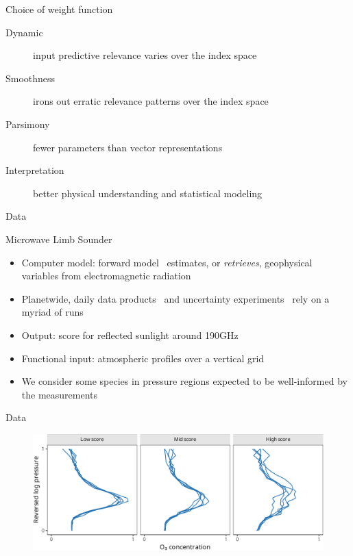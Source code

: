 \documentclass[final]{beamer}
\begin{document}
\begin{frame}[t]
{\begin{minipage}[t][76cm][t]{58cm}
{\begin{minipage}[t][40cm][t]{28cm}
          \begin{block}{Choice of weight function}
            \begin{description}
            \item[Dynamic] input predictive relevance varies over the index
              space
            \item[Smoothness] irons out erratic relevance patterns over the
              index space
            \item[Parsimony] fewer parameters than vector representations
            \item[Interpretation] better physical understanding and
              statistical modeling
            \end{description}
          \end{block}
        \end{minipage}
      }
      \vskip1cm
      \colorbox{yellow!33}{
        \begin{minipage}[t][50cm][t]{58cm}
          Data
          \begin{block}{Microwave Limb Sounder}
            \begin{itemize}
            \item Computer model: forward
              model~\cite{read2006,schwartz2006,waters2006} estimates, or
              \emph{retrieves}, geophysical variables from electromagnetic radiation
            \item Planetwide, daily data products~\cite{liversey2020} and uncertainty
              experiments~\cite{turmon2019,braverman2021} rely on a myriad of runs
            \item Output: score for reflected sunlight around 190GHz~\cite{johnson2020}
            \item Functional input: atmospheric profiles over a vertical grid
            \item We consider some species in pressure regions expected to be
              well-informed by the measurements~\cite{liversey2020}
            \end{itemize}
          \end{block}
          \begin{block}{Data}
            \begin{figure}
              \centering
              \includegraphics[width=.85\linewidth]{inc/mls_input_profiles_fsc045}
            \end{figure}


\end{block}
\end{minipage}}
\end{minipage}}
\end{frame}
\end{document}
